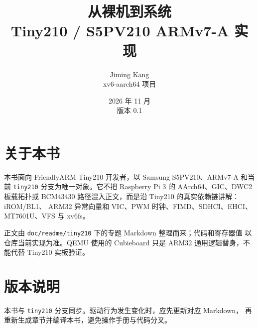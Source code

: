 \documentclass[UTF8,zihao=-4,fontset=none,oneside]{ctexbook}
\title{从裸机到系统\\[4pt]\Large Tiny210 / S5PV210 ARMv7-A 实现}
\author{Jiming Kang\\\small xv6-aarch64 项目}
\date{2026 年 11 月\\\small 版本 0.1}
\begin{document}
\frontmatter
\maketitle

\chapter*{关于本书}
本书面向 FriendlyARM Tiny210 开发者，以 Samsung S5PV210、ARMv7-A 和当前
\texttt{tiny210} 分支为唯一对象。它不把 Raspberry Pi 3 的 AArch64、GIC、DWC2
板载拓扑或 BCM43430 路径混入正文，而是沿 Tiny210 的真实依赖链讲解：iROM/BL1、
ARM32 异常向量和 VIC、PWM 时钟、FIMD、SDHCI、EHCI、MT7601U、VFS 与 xv6fs。

正文由 \texttt{doc/readme/tiny210} 下的专题 Markdown 整理而来；代码和寄存器值
以仓库当前实现为准。QEMU 使用的 Cubieboard 只是 ARM32 通用逻辑替身，不能代替
Tiny210 实板验证。

\tableofcontents

\mainmatter












\backmatter
\chapter*{版本说明}
本书与 \texttt{tiny210} 分支同步。驱动行为发生变化时，应先更新对应 Markdown，
再重新生成章节并编译本书，避免操作手册与代码分叉。
\end{document}
